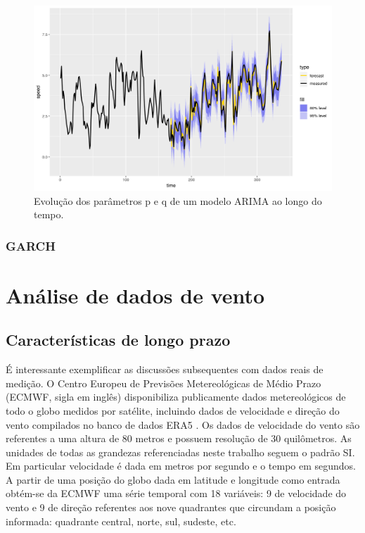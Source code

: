 \documentclass[
	12pt,				%
	openright,			%
	oneside,			%
	a4paper,			%
	english,			%
	french,				%
	spanish,			%
	brazil				%
	]{abntex2}
\begin{document}

\begin{figure}[h]
    \centering
	\includegraphics[width=\textwidth]{var_result}
	\caption{Evolução dos parâmetros p e q de um modelo ARIMA ao longo do tempo.}
\end{figure}
\FloatBarrier

\section{GARCH}


\cleardoublepage
\part{Análise de dados de vento}

\chapter{Características de longo prazo}

É interessante exemplificar as discussões subsequentes com dados reais de medição. O Centro Europeu de Previsões Metereológicas de Médio Prazo (ECMWF, sigla em inglês) disponibiliza publicamente dados metereológicos de todo o globo medidos por satélite, incluindo dados de velocidade e direção do vento compilados no banco de dados ERA5 \cite{era5}. Os dados de velocidade do vento são referentes a uma altura de 80 metros e possuem resolução de 30 quilômetros. As unidades de todas as grandezas referenciadas neste trabalho seguem o padrão SI. Em particular velocidade é dada em metros por segundo e o tempo em segundos. A partir de uma posição do globo dada em latitude e longitude como entrada obtém-se da ECMWF uma série temporal com 18 variáveis: 9 de velocidade do vento e 9 de direção referentes aos nove quadrantes que circundam a posição informada: quadrante central, norte, sul, sudeste, etc. 
\end{document}
